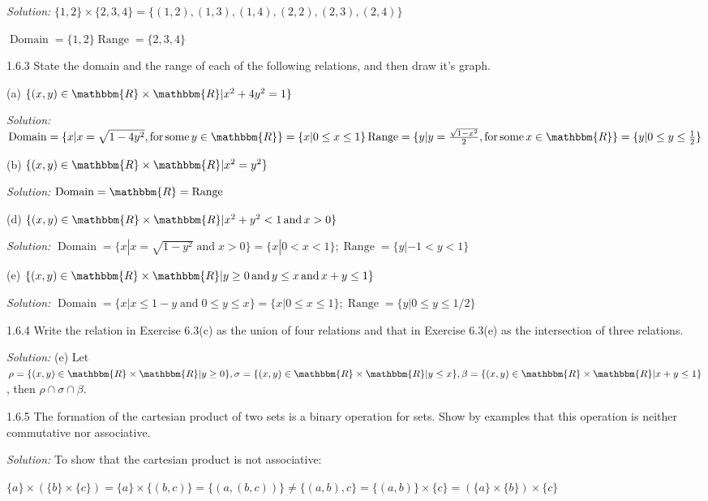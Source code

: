 \documentclass{letter}
\newcommand{\tmname}[1]{\textsc{#1}}
\newcommand{\tmop}[1]{\ensuremath{\operatorname{#1}}}
\newcommand{\tmtextit}[1]{{\itshape{#1}}}
\newcommand{\um}{-}
\begin{document}
\tmtextit{Solution:} $\{1, 2\} \times \{2, 3, 4\}=\{(1, 2), (1, 3), (1, 4),
(2, 2), (2, 3), (2, 4)\}$

$\tmop{Domain} =\{1, 2\} \tmop{Range} =\{2, 3, 4\}$

1.6.3 State the domain and the range of each of the following relations, and
then draw it's graph.

(a) $\{(x, y) \in \mathbbm{R} \times \mathbbm{R}| x^2 + 4 y^2 = 1\}$

\tmtextit{Solution:} $\tmop{Domain} =\{x| x = \sqrt{1 - 4 y^2}, \tmop{for}
\tmop{some} y \in \mathbbm{R}\}=\{x| 0 \leq x \leq 1\} \\
\tmop{Range} =\{y| y = \frac{\sqrt{1 - x^2}}{2}, \tmop{for} \tmop{some} x \in
\mathbbm{R}\}=\{y| 0 \leq y \leq \frac{1}{2} \}$

(b) $\{(x, y) \in \mathbbm{R} \times \mathbbm{R}| x^2 = y^2 \}$

\tmtextit{Solution:} $\tmop{Domain} =\mathbbm{R}= \tmop{Range}$

(d) $\{(x, y) \in \mathbbm{R} \times \mathbbm{R}| x^2 + y^2 < 1 \tmop{and} x >
0\}$

\tmtextit{Solution:} $\tmop{Domain} =\{x | x = \sqrt{1 - y^2} \tmop{and} x >
0\}=\{x | 0 < x < 1\}; \tmop{Range} =\{y | \um 1 < y < 1\}$

(e) {\tmname{$\{(x, y) \in \mathbbm{R} \times \mathbbm{R}| y \geq 0 \tmop{and}
y \leq x \tmop{and} x + y \leq 1\}$}}

\tmtextit{Solution:} $\tmop{Domain} =\{x | x \leq 1 - y \tmop{and} 0 \leq y
\leq x\}=\{x | 0 \leq x \leq 1\}; \tmop{Range} =\{y | 0 \leq y \leq 1 / 2\}$

1.6.4 Write the relation in Exercise 6.3(c) as the union of four relations and
that in Exercise 6.3(e) as the intersection of three relations.

\tmtextit{Solution:} (e) Let $\rho =\{(x, y) \in \mathbbm{R} \times
\mathbbm{R}| y \geq 0\}, \sigma =\{(x, y) \in \mathbbm{R} \times \mathbbm{R}|
y \leq x\}, \beta =\{(x, y) \in \mathbbm{R} \times \mathbbm{R}| x + y \leq
1\}$, then $\rho \cap \sigma \cap \beta$.

1.6.5 The formation of the cartesian product of two sets is a binary operation
for sets. Show by examples that this operation is neither commutative nor
associative.

\tmtextit{Solution:} To show that the cartesian product is not associative:

$\{a\} \times (\{b\} \times \{c\}) =\{a\} \times \{(b, c)\}=\{(a, (b, c))\}
\neq \{(a, b), c\}=\{(a, b)\} \times \{c\}= (\{a\} \times \{b\}) \times \{c\}$
\end{document}

